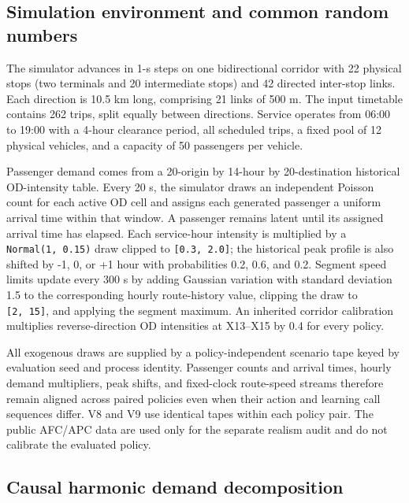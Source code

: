 \documentclass[preprint,12pt,authoryear,nopreprintline]{elsarticle}
\begin{document}
\subsection{Simulation environment and common random
numbers}\label{simulation-environment-and-common-random-numbers}

The simulator advances in 1-s steps on one bidirectional corridor with
22 physical stops (two terminals and 20 intermediate stops) and 42
directed inter-stop links. Each direction is 10.5 km long, comprising 21
links of 500 m. The input timetable contains 262 trips, split equally
between directions. Service operates from 06:00 to 19:00 with a 4-hour
clearance period, all scheduled trips, a fixed pool of 12 physical
vehicles, and a capacity of 50 passengers per vehicle.

Passenger demand comes from a 20-origin by 14-hour by 20-destination
historical OD-intensity table. Every 20 s, the simulator draws an
independent Poisson count for each active OD cell and assigns each
generated passenger a uniform arrival time within that window. A
passenger remains latent until its assigned arrival time has elapsed.
Each service-hour intensity is multiplied by a \texttt{Normal(1,\ 0.15)}
draw clipped to \texttt{{[}0.3,\ 2.0{]}}; the historical peak profile is
also shifted by -1, 0, or +1 hour with probabilities 0.2, 0.6, and 0.2.
Segment speed limits update every 300 s by adding Gaussian variation
with standard deviation 1.5 to the corresponding hourly route-history
value, clipping the draw to \texttt{{[}2,\ 15{]}}, and applying the
segment maximum. An inherited corridor calibration multiplies
reverse-direction OD intensities at X13--X15 by 0.4 for every policy.

All exogenous draws are supplied by a policy-independent scenario tape
keyed by evaluation seed and process identity. Passenger counts and
arrival times, hourly demand multipliers, peak shifts, and fixed-clock
route-speed streams therefore remain aligned across paired policies even
when their action and learning call sequences differ. V8 and V9 use
identical tapes within each policy pair. The public AFC/APC data are
used only for the separate realism audit and do not calibrate the
evaluated policy.

\subsection{Causal harmonic demand
decomposition}\label{causal-harmonic-demand-decomposition}
\end{document}
